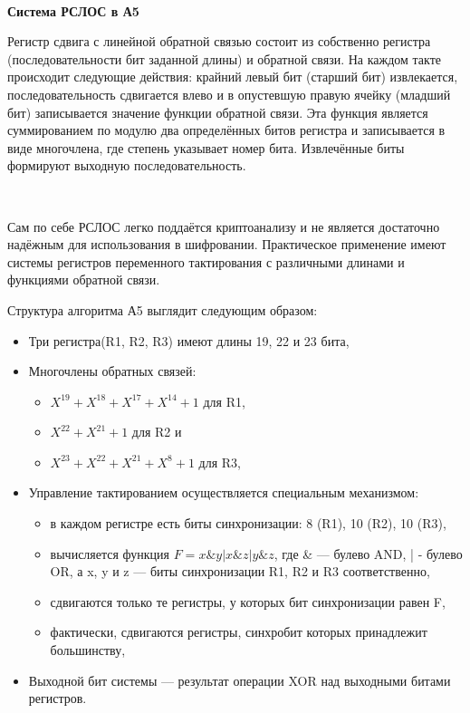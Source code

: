 \documentclass[a4paper]{report}
\begin{document}
~

\textbf{Система РСЛОС в А5}

Регистр сдвига с линейной обратной связью состоит из собственно регистра (последовательности бит заданной длины) и обратной связи. На каждом такте происходит следующие действия: крайний левый бит (старший бит) извлекается, последовательность сдвигается влево и в опустевшую правую ячейку (младший бит) записывается значение функции обратной связи. Эта функция является суммированием по модулю два определённых битов регистра и записывается в виде многочлена, где степень указывает номер бита. Извлечённые биты формируют выходную последовательность.

~

Сам по себе РСЛОС легко поддаётся криптоанализу и не является достаточно надёжным для использования в шифровании. Практическое применение имеют системы регистров переменного тактирования с различными длинами и функциями обратной связи.

Структура алгоритма А5 выглядит следующим образом:
\begin{itemize}
\item Три регистра(R1, R2, R3) имеют длины 19, 22 и 23 бита,
\item Многочлены обратных связей:
\begin{itemize}
\item $X^{19} + X^{18} + X^{17} + X^{14} + 1$ для R1,
\item $X^{22} + X^{21} + 1$ для R2 и
\item $X^{23} + X^{22} + X^{21} + X^8 + 1$ для R3,
\end{itemize}
\item Управление тактированием осуществляется специальным механизмом:
\begin{itemize}
\item в каждом регистре есть биты синхронизации: 8 (R1), 10 (R2), 10 (R3),
\item вычисляется функция $F = x\&y|x\&z|y\&z$, где \& — булево AND, | - булево OR, а x, y и z — биты синхронизации R1, R2 и R3 соответственно,
\item сдвигаются только те регистры, у которых бит синхронизации равен F,
\item фактически, сдвигаются регистры, синхробит которых принадлежит большинству,
\end{itemize}
\item Выходной бит системы — результат операции XOR над выходными битами регистров.
\end{itemize}
\end{document}
